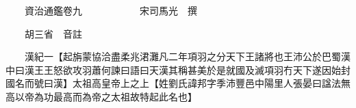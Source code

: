 










 


 
 


 

  
  
  
  
  





  
  
  
  
  
 
  

  

  
  
  



  

 
 

  
   




  

  
  


  　　資治通鑑卷九　　　　　　宋司馬光　撰

　　胡三省　音註

　　漢紀一【起旃蒙協洽盡柔兆涒灘凡二年項羽之分天下王諸將也王沛公於巴蜀漢中曰漢王王怒欲攻羽蕭何諫曰語曰天漢其稱甚美於是就國及滅項羽冇天下遂因始封國名而號曰漢】太祖高皇帝上之上【姓劉氏諱邦字季沛豐邑中陽里人張晏曰諡法無高以帝為功最高而為帝之太祖故特起此名也】

